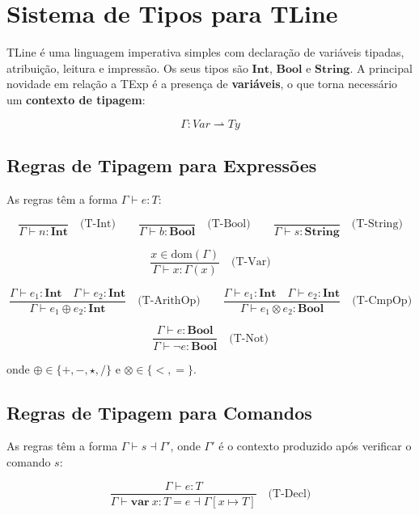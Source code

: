 \section{Sistema de Tipos para TLine}

TLine é uma linguagem imperativa simples com declaração de variáveis
tipadas, atribuição, leitura e impressão. Os seus tipos são
\(\mathbf{Int}\), \(\mathbf{Bool}\) e \(\mathbf{String}\). A
principal novidade em relação a TExp é a presença de
\textbf{variáveis}, o que torna necessário um \textbf{contexto de tipagem}:

\[
  \Gamma : \mathit{Var} \rightharpoonup \mathit{Ty}
\]

\subsection{Regras de Tipagem para Expressões}

As regras têm a forma \(\Gamma \vdash e : T\):

\[
  \frac{}{\Gamma \vdash n : \mathbf{Int}} \quad\text{(T-Int)}
  \qquad
  \frac{}{\Gamma \vdash b : \mathbf{Bool}} \quad\text{(T-Bool)}
  \qquad
  \frac{}{\Gamma \vdash s : \mathbf{String}} \quad\text{(T-String)}
\]

\[
  \frac{x \in \mathrm{dom}(\Gamma)}{\Gamma \vdash x : \Gamma(x)}
  \quad\text{(T-Var)}
\]

\[
  \frac{\Gamma \vdash e_1 : \mathbf{Int} \quad \Gamma \vdash e_2 : \mathbf{Int}}
  {\Gamma \vdash e_1 \oplus e_2 : \mathbf{Int}} \quad\text{(T-ArithOp)}
  \qquad
  \frac{\Gamma \vdash e_1 : \mathbf{Int} \quad \Gamma \vdash e_2 : \mathbf{Int}}
  {\Gamma \vdash e_1 \otimes e_2 : \mathbf{Bool}} \quad\text{(T-CmpOp)}
\]

\[
  \frac{\Gamma \vdash e : \mathbf{Bool}}
  {\Gamma \vdash \neg e : \mathbf{Bool}} \quad\text{(T-Not)}
\]

onde \(\oplus \in \{+, -, \star, /\}\) e \(\otimes \in \{<, =\}\).

\subsection{Regras de Tipagem para Comandos}

As regras têm a forma \(\Gamma \vdash s \dashv \Gamma'\), onde
\(\Gamma'\) é o contexto produzido após verificar o comando \(s\):

\[
  \frac{\Gamma \vdash e : T}
  {\Gamma \vdash \mathbf{var}\ x : T = e \dashv \Gamma[x \mapsto T]}
  \quad\text{(T-Decl)}
\]

